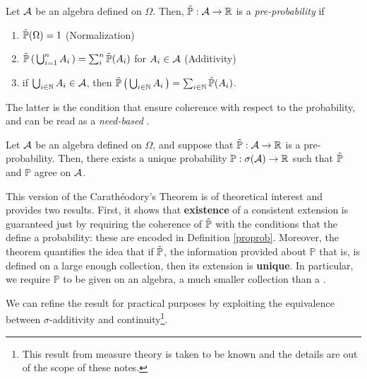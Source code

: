 \goodbreak\begin{my_definition}
	\label{proprob}
	Let $\mathcal{A}$ be an algebra defined on $\Omega$. Then, $\tilde{\mathbb{P}}:\mathcal{A}\to\mathbb{R}$ is a \textit{pre-probability} if
	\begin{enumerate}
		\item $\tilde{\mathbb{P}}( \Omega ) = 1$ \hfill (Normalization)
		\item $\tilde{\mathbb{P}} \left( \, \bigcup^n_{i=1} A_i \, \right) = \sum^n_i \tilde{\mathbb{P}}(A_i)$ for $A_i\in\mathcal{A}$ \hfill (Additivity)
		\item if $\bigcup_{ i \in \mathbb{N} } A_i \in \mathcal{A}$, then $\tilde{\mathbb{P}} \left( \,\bigcup_{ i \in \mathbb{N} } A_i \,\right) = \sum_{ i \in \mathbb{N}} \tilde{\mathbb{P}}(A_i)$.
	\end{enumerate}
\end{my_definition}
\begin{my_remark}
	The latter is the condition that ensure coherence with respect to the probability, and can be read as a \textit{need-based \sigmaadd}.
\end{my_remark}

\goodbreak\begin{my_theorem}
	\label{carathéorodory}
	Let $\mathcal{A}$ be an algebra defined on $\Omega$, and suppose that $\tilde{\mathbb{P}} : \mathcal{A} \to \mathbb{R}$ is a pre-probability.	Then, there exists a unique probability $\mathbb{P}: \sigma ( \mathcal{A} ) \to \mathbb{R}$ such that $\tilde{\mathbb{P}}$ and $\mathbb{P}$ agree on $\mathcal{A}$.
\end{my_theorem}
\begin{my_remark}
	This version of the Carathéodory's Theorem is of theoretical interest and provides two results.
	First, it shows that \textbf{existence} of a consistent extension is guaranteed just by requiring the coherence of $\tilde{\mathbb{P}}$ with the conditions that the define a probability: these are encoded in Definition \ref{proprob}.
	Moreover, the theorem quantifies the idea that if $\tilde{\mathbb{P}}$, the information provided about $\mathbb{P}$ that is, is defined on a large enough collection, then its extension is \textbf{unique}. In particular, we require $\mathbb{P}$ to be given on an algebra, a much smaller collection than a \sigmaalg.
\end{my_remark}

We can refine the result for practical purposes by exploiting the equivalence between $\sigma$-additivity and continuity\footnote{This result from measure theory is taken to be known and the details are out of the scope of these notes.}.

